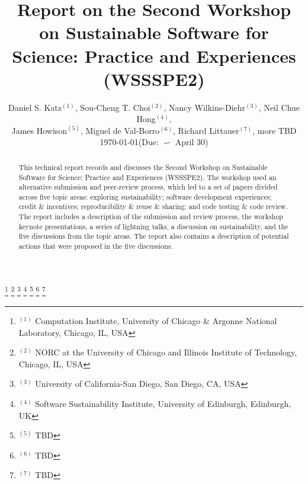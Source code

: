 \documentclass[11pt, oneside]{amsart}
\begin{document}
\title[]{Report on the Second Workshop on Sustainable Software for Science: Practice and Experiences (WSSSPE2)} 

\author{Daniel S. Katz$^{(1)}$, Sou-Cheng T. Choi$^{(2)}$, Nancy Wilkins-Diehr$^{(3)}$, Neil Chue Hong$^{(4)}$, 
\\James Howison$^{(5)}$, Miguel de Val-Borro$^{(6)}$, Richard Littauer$^{(7)}$, more TBD %
\\{\scriptsize\today \quad  (Due:  $\backsim$ April 30)}} 
%
\thanks{{}$^{(1)}$ Computation Institute, University of Chicago \& Argonne National Laboratory, Chicago, IL, USA}
%
\thanks{{}$^{(2)}$ NORC at the University of Chicago and   Illinois Institute of Technology, Chicago, IL, USA}
%
\thanks{{}$^{(3)}$ University of California-San Diego, San Diego, CA, USA}
%
\thanks{{}$^{(4)}$ Software Sustainability Institute, University of Edinburgh, Edinburgh, UK}
%
\thanks{{}$^{(5)}$ TBD}
%
\thanks{{}$^{(6)}$ TBD}  
%
\thanks{{}$^{(7)}$ TBD}   
%  
%
%
%
%
%
%

\begin{abstract}      
This technical report records and discusses the Second Workshop on Sustainable
Software for Science: Practice and Experiences (WSSSPE2). The workshop used an
alternative submission and peer-review process, which led to a set of papers
divided across five topic areas: exploring sustainability; software development
experiences; credit \& incentives; reproducibility \& reuse \& sharing; and code
testing \& code review. The report includes a description of the submission and
review process, the workshop keynote presentations, a series of lightning talks,
a discussion on sustainability, and the five discussions from the topic areas.
The report also contains a description of potential actions that were proposed
in the five
discussions.
\end{abstract}
\end{document}
